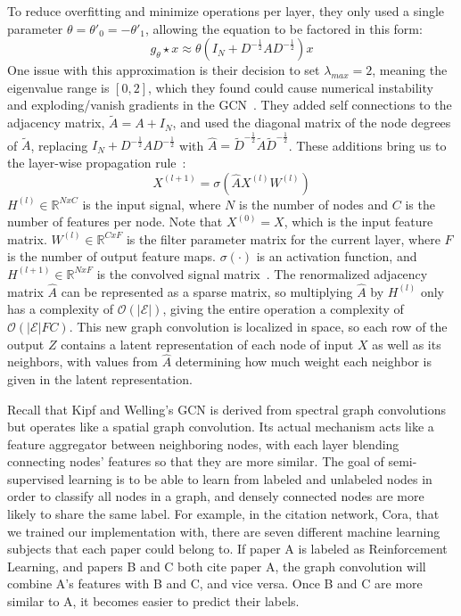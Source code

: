 To reduce overfitting and minimize operations per layer, they only used a single parameter $\theta = \theta'_0 = -\theta'_1$, allowing the equation to be factored in this form:
\begin{equation}
\label{single_param}
g_\theta \star x \approx \theta(I_N + D^{-\frac{1}{2}}AD^{-\frac{1}{2}})x
\end{equation}
One issue with this approximation is their decision to set $\lambda_{max} = 2$, meaning the eigenvalue range is $[0,2]$, which they found could cause numerical instability and exploding/vanish gradients in the GCN~\cite{Kipf2016}. They added self connections to the adjacency matrix, $\tilde{A} = A + I_N$, and used the diagonal matrix of the node degrees of $\tilde{A}$, replacing $I_N + D^{-\frac{1}{2}}AD^{-\frac{1}{2}}$ with $\hat{A} = \tilde{D}^{-\frac{1}{2}}\tilde{A}\tilde{D}^{-\frac{1}{2}}$. These additions bring us to the layer-wise propagation rule~\cite{Kipf2016}:
\begin{equation}
\label{prop_rule}
X^{(l+1)} = \sigma(\hat{A}X^{(l)}W^{(l)})
\end{equation}
$H^{(l)} \in \mathbb{R}^{N x C}$ is the input signal, where $N$ is the number of nodes and $C$ is the number of features per node. Note that $X^{(0)} = X$, which is the input feature matrix. $W^{(l)} \in \mathbb{R}^{C x F}$ is the filter parameter matrix for the current layer, where $F$ is the number of output feature maps. $\sigma(\cdot)$ is an activation function, and $H^{(l+1)} \in \mathbb{R}^{N x F}$ is the convolved signal matrix~\cite{Kipf2016}. The renormalized adjacency matrix $\hat{A}$ can be represented as a sparse matrix, so multiplying $\hat{A}$ by $H^{(l)}$ only has a complexity of $\mathcal{O}(|\mathcal{E}|)$, giving the entire operation a complexity of $\mathcal{O}(|\mathcal{E}|FC)$.  This new graph convolution is localized in space, so each row of the output $Z$ contains a latent representation of each node of input $X$ as well as its neighbors, with values from $\hat{A}$ determining how much weight each neighbor is given in the latent representation.

Recall that Kipf and Welling's GCN is derived from spectral graph convolutions but operates like a spatial graph convolution. Its actual mechanism acts like a feature aggregator between neighboring nodes, with each layer blending connecting nodes' features so that they are more similar. The goal of semi-supervised learning is to be able to learn from labeled and unlabeled nodes in order to classify all nodes in a graph, and densely connected nodes are more likely to share the same label. For example, in the citation network, Cora, that we trained our implementation with, there are seven different machine learning subjects that each paper could belong to. If paper A is labeled as Reinforcement Learning, and papers B and C both cite paper A, the graph convolution will combine A's features with B and C, and vice versa. Once B and C are more similar to A, it becomes easier to predict their labels.

